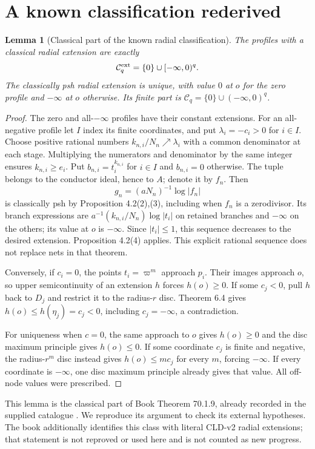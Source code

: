 \documentclass[11pt]{article}
\newtheorem{lemma}[theorem]{Lemma}
\theoremstyle{definition}
\newcommand{\Cq}{\mathcal C_q}
\begin{document}
\section{A known classification rederived}
\begin{lemma}[Classical part of the known radial classification]
The profiles with a classical radial extension are exactly
\[
 \Cq^{\rm ext}=\{0\}\cup[-\infty,0)^q.
\]
The classically psh radial extension is unique, with value $0$ at $o$ for the zero profile and
$-\infty$ at $o$ otherwise. Its finite part is
$\Cq=\{0\}\cup(-\infty,0)^q$.
\end{lemma}
\begin{proof}
The zero and all-$-\infty$ profiles have their constant extensions.
For an all-negative profile let $I$ index its finite coordinates, and
put $\lambda_i=-c_i>0$ for $i\in I$. Choose positive rational numbers
$k_{n,i}/N_n\nearrow\lambda_i$ with a common denominator at each stage.
Multiplying the numerators and denominator by the same integer ensures
$k_{n,i}\geq e_i$. Put $b_{n,i}=t_i^{k_{n,i}}$ for $i\in I$ and
$b_{n,i}=0$ otherwise. The tuple belongs to the conductor ideal, hence
to $A$; denote it by $f_n$. Then
\[
 g_n=(aN_n)^{-1}\log|f_n|
\]
is classically psh by Proposition 4.2(2),(3), including when $f_n$ is a
zerodivisor. Its branch expressions are
$a^{-1}(k_{n,i}/N_n)\log|t_i|$ on retained branches and $-\infty$ on
the others; its value at $o$ is $-\infty$. Since $|t_i|\leq1$, this
sequence decreases to the desired extension. Proposition 4.2(4) applies.
This explicit rational sequence does not replace nets in that theorem.

Conversely, if $c_i=0$, the points $t_i=\varpi^m$ approach $p_i$.
Their images approach $o$, so upper semicontinuity of an extension $h$
forces $h(o)\geq0$. If some $c_j<0$, pull $h$ back to $D_j$ and
restrict it to the radius-$r$ disc. Theorem 6.4 gives
$h(o)\leq h(\eta_j)=c_j<0$, including $c_j=-\infty$, a contradiction.

For uniqueness when $c=0$, the same approach to $o$ gives $h(o)\geq0$
and the disc maximum principle gives $h(o)\leq0$. If some coordinate
$c_j$ is finite and negative, the radius-$r^m$ disc instead gives
$h(o)\leq mc_j$ for every $m$, forcing $-\infty$. If every coordinate
is $-\infty$, one disc maximum principle already gives that value.
All off-node values were prescribed.
\end{proof}

This lemma is the classical part of Book Theorem 70.1.9, already recorded
in the supplied catalogue \cite{Book}. We reproduce its argument to
check its external hypotheses. The book additionally identifies this
class with literal CLD-v2 radial extensions; that statement is not
reproved or used here and is not counted as new progress.
\end{document}
